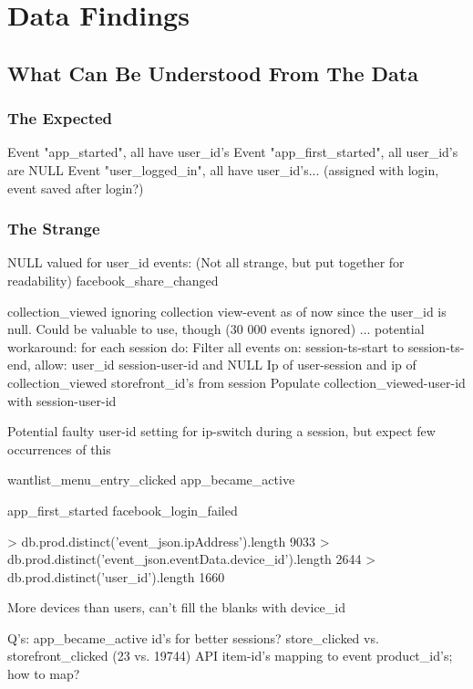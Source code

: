 
\section{Data Findings}
\subsection{What Can Be Understood From The Data}



\subsubsection{The Expected}
Event "app\_started", all have user\_id's
Event "app\_first\_started", all user\_id's are NULL
Event "user\_logged\_in", all have user\_id's... (assigned with login, event saved after login?)

\subsubsection{The Strange}
NULL valued  for user\_id events: (Not all strange, but put together for readability)
facebook\_share\_changed

collection\_viewed  ignoring collection view-event as of now since the user\_id
is null. Could be valuable to use, though (30 000 events ignored) ...
potential workaround:
    for each session do:
        Filter all events on:
            session-ts-start to session-ts-end,
            allow: user\_id session-user-id and NULL
            Ip of user-session and ip of collection\_viewed
            storefront\_id's from session
                Populate collection\_viewed-user-id with session-user-id

Potential faulty user-id setting for ip-switch during a session, but expect few
occurrences of this

wantlist\_menu\_entry\_clicked
app\_became\_active

app\_first\_started
facebook\_login\_failed

> db.prod.distinct('event\_json.ipAddress').length
9033
> db.prod.distinct('event\_json.eventData.device\_id').length
2644
> db.prod.distinct('user\_id').length
1660

More devices than users, can't fill the blanks with device\_id

Q's:
    app\_became\_active id's for better sessions?
    store\_clicked vs. storefront\_clicked (23 vs. 19744)
    API item-id's mapping to event product\_id's; how to map?



